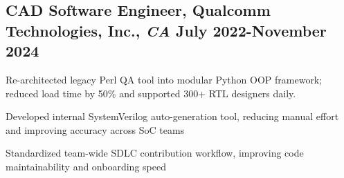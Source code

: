 \documentclass[10pt]{article}
\begin{document}
\subsection*{CAD Software Engineer{\normalfont, Qualcomm Technologies, Inc.,
            \textit{CA} \hfill
            July 2022-November 2024}}
\begin{asparaitem}
    \item Re-architected legacy Perl QA tool into modular Python OOP framework; reduced load time by 50\% and supported 300+ RTL designers daily.
    \item Developed internal SystemVerilog auto-generation tool, reducing manual effort and improving accuracy across SoC teams
    \item Standardized team-wide SDLC contribution workflow, improving code maintainability and onboarding speed
\end{asparaitem}
\end{document}
